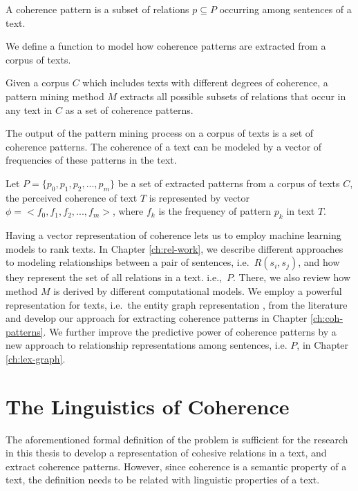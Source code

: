 \begin{definition}
\label{def:def-coh-pattern}
A coherence pattern is a subset of relations $p \subseteq P$ occurring among sentences of a text.   
\end{definition}

We define a function to model how coherence patterns are extracted from a corpus of texts. 

\begin{definition}
Given a corpus $C$ which includes texts with different degrees of coherence, a pattern mining method $M$ extracts all possible subsets of relations that occur in any text in $C$ as a set of coherence patterns. 
\end{definition} 

The output of the pattern mining process on a corpus of texts is a set of coherence patterns. 
The coherence of a text can be modeled by a vector of frequencies of these patterns in the text. 

\begin{definition}
Let $P=\lbrace p_0,p_1,p_2,...,p_m \rbrace$ be a set of extracted patterns from a corpus of texts $C$, the perceived coherence of text $T$ is represented by  vector $\phi = <f_0, f_1, f_2,...,f_m>$, where $f_k$ is the frequency of pattern $p_k$ in text $T$. 
\end{definition}

Having a vector representation of coherence lets us to employ machine learning models to rank texts. 
In Chapter \ref{ch:rel-work}, we describe different approaches to modeling relationships between a pair of sentences, i.e.\ $R(s_i,s_j)$, and how they represent the set of all relations in a text. i.e.,\ $P$.  
There, we also review how method $M$ is derived by different computational models. 
We employ a powerful representation for texts, i.e.\ the entity graph representation \cite{guinaudeau13}, from the literature and develop our approach for extracting coherence patterns in Chapter \ref{ch:coh-patterns}. 
We further improve the predictive power of coherence patterns by a new approach to relationship representations among sentences, i.e. $P$, in Chapter \ref{ch:lex-graph}. 

\section{The Linguistics of Coherence}

The aforementioned formal definition of the problem is sufficient for the research in this thesis to develop a representation of cohesive relations in a text, and extract coherence patterns. 
However, since coherence is a semantic property of a text, the definition needs to be related with linguistic properties of a text. 


